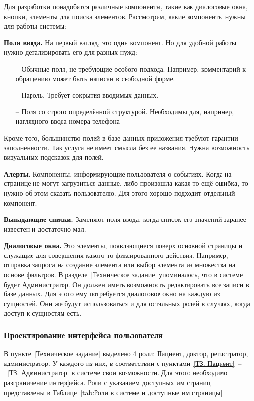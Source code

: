 \documentclass[a4paper,article]{article}
\begin{document}
    Для разработки понадобятся различные компоненты, такие как диалоговые окна, кнопки, элементы для поиска элементов. Рассмотрим, какие компоненты нужны для работы системы:

    \textbf{Поля ввода.} На первый взгляд, это один компонент. Но для удобной работы нужно детализировать его для разных нужд:

    \begin{itemize}[nolistsep]
        \item[--] Обычные поля, не требующие особого подхода. Например, комментарий к обращению может быть написан в свободной форме.
        \item[--] Пароль. Требует сокрытия вводимых данных.
        \item[--] Поля со строго определённой структурой. Необходимы для, например, наглядного ввода номера телефона
    \end{itemize}

    Кроме того, большинство полей в базе данных приложения требуют гарантии заполненности. Так услуга не имеет смысла без её названия. Нужна возможность визуальных подсказок для полей.

    \textbf{Алерты.} Компоненты, информирующие пользователя о событиях. Когда на странице не могут загрузиться данные, либо произошла какая-то ещё ошибка, то нужно об этом сказать пользователю. Для этого хорошо подходит отдельный компонент.

    \textbf{Выпадающие списки.} Заменяют поля ввода, когда список его значений заранее известен и достаточно мал.

    \textbf{Диалоговые окна.} Это элементы, появляющиеся поверх основной страницы и служащие для совершения какого-то фиксированного действия. Например, отправка запроса на создание элемента или выбор элемента из множества на основе фильтров. В разделе~\ref{Техническое задание} упоминалось, что в системе будет Администратор. Он должен иметь возможность редактировать все записи в базе данных. Для этого ему потребуется диалоговое окно на каждую из сущностей. Они же будут использоваться и для остальных ролей в случаях, когда доступ к сущностям есть.

    \subsubsection{Проектирование интерфейса пользователя}

    В пункте~\ref{Техническое задание} выделено 4 роли: Пациент, доктор, регистратор, администратор. У каждого из них, в соответствии с пунктами~\ref{ТЗ. Пациент}~--~\ref{ТЗ. Администратор} в системе свои возможности. Для этого необходимо разграничение интерфейса. Роли с указанием доступных им страниц представлены в Таблице~\ref{tab:Роли в системе и доступные им страницы}
\end{document}
